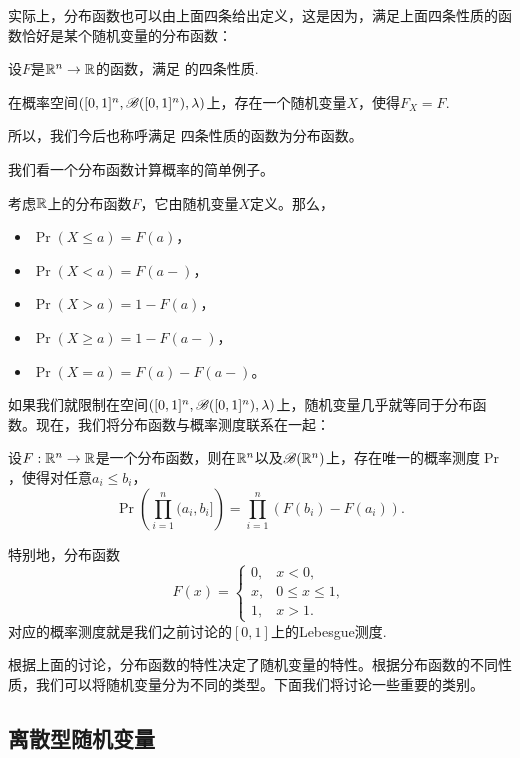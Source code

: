实际上，分布函数也可以由上面四条给出定义，这是因为，满足上面四条性质的函数恰好是某个随机变量的分布函数：

\begin{theorem}\label{thm:distribution-function}
设$F$是$\mathbb{R}^n\to\mathbb{R}$的函数，满足 的四条性质. 

在概率空间$([0,1]^n,\mathscr{B}([0,1]^n),\lambda)$上，存在一个随机变量$X$，使得$F_X=F$.
\end{theorem}

所以，我们今后也称呼满足 四条性质的函数为分布函数。

我们看一个分布函数计算概率的简单例子。

\begin{example}\label{ex:distribution-prob}
考虑$\mathbb{R}$上的分布函数$F$，它由随机变量$X$定义。那么，
\begin{itemize}
    \item $\Pr(X\leq a)=F(a)$，
    \item $\Pr(X<a)=F(a-)$，
    \item $\Pr(X>a)=1-F(a)$，
    \item $\Pr(X\geq a)=1-F(a-)$，
    \item $\Pr(X=a)=F(a)-F(a-)$。
\end{itemize}
\end{example}

如果我们就限制在空间$([0,1]^n,\mathscr{B}([0,1]^n),\lambda)$上，随机变量几乎就等同于分布函数。现在，我们将分布函数与概率测度联系在一起：

\begin{theorem}\label{thm:uniqueness-of-distribution-function}
设$F:\mathbb{R}^n\to\mathbb{R}$是一个分布函数，则在$\mathbb{R}^n$以及$\mathscr{B}(\mathbb{R}^n)$上，存在唯一的概率测度$\Pr$，使得对任意$a_i\leq b_i$，
\[
    \Pr\left(\prod_{i=1}^n(a_i,b_i]\right) = \prod_{i=1}^n (F(b_i)-F(a_i)).
\]
\end{theorem}

特别地，分布函数
\[F(x)=\begin{cases}
    0,&x<0,\\
    x,&0\leq x\leq 1,\\
    1,&x>1.
\end{cases}\]
对应的概率测度就是我们之前讨论的$[0,1]$上的Lebesgue测度.

根据上面的讨论，分布函数的特性决定了随机变量的特性。根据分布函数的不同性质，我们可以将随机变量分为不同的类型。下面我们将讨论一些重要的类别。

\subsection{离散型随机变量}

